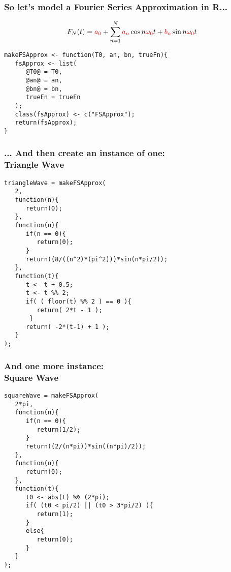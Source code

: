 \documentclass{beamer}
\begin{document}
\begin{frame}[fragile]
   \frametitle{So let's model a Fourier Series Approximation in R...}
   \[
      F_{N}(t) = \textcolor{red}{a_{0}} + \sum_{n=1}^{N}
      \textcolor{red}{a_{n}} \cos n \textcolor{red}{\omega_{0}} t + 
      \textcolor{red}{b_{n}} \sin n \textcolor{red}{\omega_{0}} t
   \]
   \begin{center}
   \begin{minipage}{100mm}
   \begin{lstlisting}[style=WithHighlights]
makeFSApprox <- function(T0, an, bn, trueFn){
   fsApprox <- list(
      @T0@ = T0,
      @an@ = an,
      @bn@ = bn,
      trueFn = trueFn
   );
   class(fsApprox) <- c("FSApprox");
   return(fsApprox);
}
   \end{lstlisting}
   \end{minipage}
   \end{center}
\end{frame}

\begin{frame}[fragile]
   \frametitle{... And then create an instance of one: \\Triangle Wave}
   \begin{center}
   \begin{minipage}{100mm}
   \begin{lstlisting}
triangleWave = makeFSApprox(
   2,
   function(n){
      return(0);
   },
   function(n){
      if(n == 0){
         return(0);
      }
      return((8/((n^2)*(pi^2)))*sin(n*pi/2));
   },
   function(t){
      t <- t + 0.5;
      t <- t %% 2;
      if( ( floor(t) %% 2 ) == 0 ){
         return( 2*t - 1 );
       }
      return( -2*(t-1) + 1 );
   }
);
   \end{lstlisting}
   \end{minipage}
   \end{center}
\end{frame}

\begin{frame}[fragile]
   \frametitle{And one more instance: \\Square Wave}
   \begin{center}
   \begin{minipage}{100mm}
   \begin{lstlisting}
squareWave = makeFSApprox(
   2*pi,
   function(n){
      if(n == 0){
         return(1/2);
      }
      return((2/(n*pi))*sin((n*pi)/2));
   },
   function(n){
      return(0);
   },
   function(t){
      t0 <- abs(t) %% (2*pi);
      if( (t0 < pi/2) || (t0 > 3*pi/2) ){
         return(1);
      }
      else{
         return(0);
      }
   }
);
   \end{lstlisting}
   \end{minipage}
   \end{center}
\end{frame}
\end{document}
